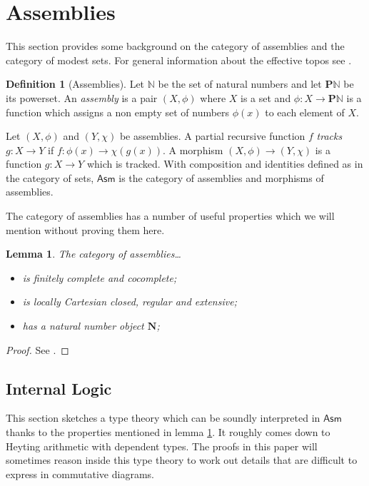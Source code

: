 \documentclass{amsart}
\theoremstyle{plain}
\newtheorem{lemma}[theorem]{Lemma}
\theoremstyle{definition}
\newtheorem{defin}[theorem]{Definition}
\newcommand\N{\mathbb N}
\newcommand\pow{\mathbf P}
\newcommand\Asm{\mathsf{Asm}}
\begin{document}
\section{Assemblies}
This section provides some background on the category of assemblies and the category of modest sets. For general information about the effective topos see \cite{MR2479466}.

\begin{defin}[Assemblies] Let $\N$ be the set of natural numbers and let $\pow\N$ be its powerset.
An \emph{assembly} is a pair $(X,\phi)$ where $X$ is a set and $\phi:X\to \pow \N$ is a function which assigns a non empty set of numbers $\phi(x)$ to each element of $X$.

Let $(X,\phi)$ and $(Y,\chi)$ be assemblies. A partial recursive function $f$ \emph{tracks} $g:X\to Y$ if $f: \phi(x) \to \chi(g(x))$. A morphism $(X,\phi)\to (Y,\chi)$ is a function $g:X\to Y$ which is tracked. With composition and identities defined as in the category of sets, $\Asm$ is the category of assemblies and morphisms of assemblies.
\end{defin}

The category of assemblies has a number of useful properties which we will mention without proving them here.

\newcommand\nno{\mathbf N}
\begin{lemma} The category of assemblies\dots
\begin{itemize}
\item is finitely complete and cocomplete;
\item is locally Cartesian closed, regular and extensive;
\item has a natural number object $\nno$;
\end{itemize}\label{essential_properties}%
\end{lemma}

\begin{proof} See \cite{MR2479466,MSC:8896618,RealCats}. \end{proof}

\subsection{Internal Logic}\label{internal}
This section sketches a type theory which can be soundly interpreted in $\Asm$ thanks to the properties mentioned in lemma \ref{essential_properties}. It roughly comes down to Heyting arithmetic with dependent types. The proofs in this paper will sometimes reason inside this type theory to work out details that are difficult to express in commutative diagrams. 
\end{document}
